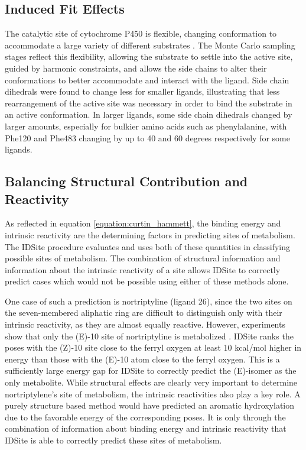 \subsection{Induced Fit Effects}
\label{subsection:p450/discussion/induced_fit}
The catalytic site of cytochrome P450 is flexible, changing conformation to accommodate a large variety of different substrates \cite{li2004structural,scott2004structure}.
The Monte Carlo sampling stages reflect this flexibility, allowing the substrate to settle into the active site, guided by harmonic constraints, and allows the side chains to alter their conformations to better accommodate and interact with the ligand.
Side chain dihedrals were found to change less for smaller ligands, illustrating that less rearrangement of the active site was necessary in order to bind the substrate in an active conformation.
In larger ligands, some side chain dihedrals changed by larger amounts, especially for bulkier amino acids such as phenylalanine, with Phe120 and Phe483 changing by up to 40 and 60 degrees respectively for some ligands.

\subsection{Balancing Structural Contribution and Reactivity}
\label{subsection:p450/discussion/structure_effects}
As reflected in equation \ref{equation:curtin_hammett}, the binding energy and intrinsic reactivity are the determining factors in predicting sites of metabolism.
The IDSite procedure evaluates and uses both of these quantities in classifying possible sites of metabolism.
The combination of structural information and information about the intrinsic reactivity of a site allows IDSite to correctly predict cases which would not be possible using either of these methods alone.

One case of such a prediction is nortriptyline (ligand 26), since the two sites on the seven-membered aliphatic ring are difficult to distinguish only with their intrinsic reactivity, as they are almost equally reactive.
However, experiments show that only the (E)-10 site of nortriptyline is metabolized \cite{linnet1997metabolism}.
IDSite ranks the poses with the (Z)-10 site close to the ferryl oxygen at least 10 kcal/mol higher in energy than those with the (E)-10 atom close to the ferryl oxygen. 
This is a sufficiently large energy gap for IDSite to correctly predict the (E)-isomer as the only metabolite. 
While structural effects are clearly very important to determine nortriptylene's site of metabolism, the intrinsic reactivities also play a key role. 
A purely structure based method would have predicted an aromatic hydroxylation due to the favorable energy of the corresponding poses.
It is only through the combination of information about binding energy and intrinsic reactivity that IDSite is able to correctly predict these sites of metabolism.

